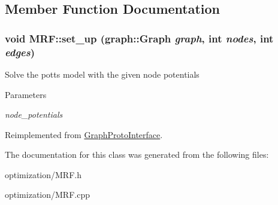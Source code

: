 \subsection{Member Function Documentation}
\hypertarget{classMRF_a928f19f948fa97796462fd9542a985fd}{
\subsubsection[{set\_\-up}]{\setlength{\rightskip}{0pt plus 5cm}void MRF::set\_\-up (graph::Graph {\em graph}, \/  int {\em nodes}, \/  int {\em edges})}}
\label{classMRF_a928f19f948fa97796462fd9542a985fd}
Solve the potts model with the given node potentials


\begin{DoxyParams}{Parameters}
\item[{\em node\_\-potentials}]\end{DoxyParams}


Reimplemented from \hyperlink{classGraphProtoInterface}{GraphProtoInterface}.



The documentation for this class was generated from the following files:\begin{DoxyCompactItemize}
\item 
optimization/MRF.h\item 
optimization/MRF.cpp\end{DoxyCompactItemize}
